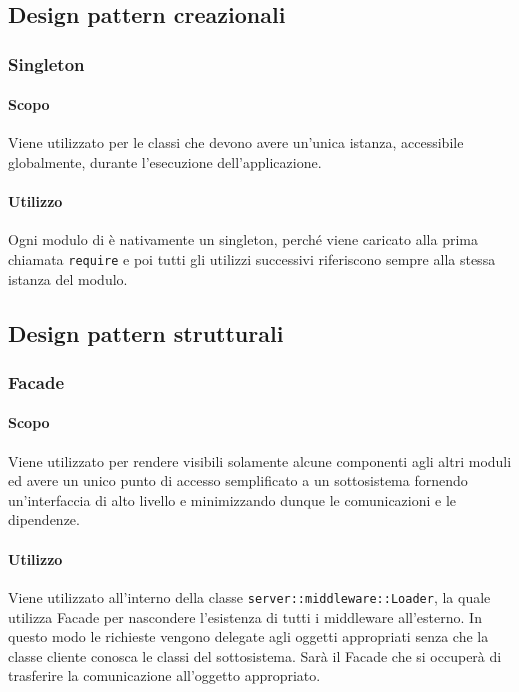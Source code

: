 \documentclass[12pt,a4paper]{article}
\begin{document}
\subsection{Design pattern creazionali}

\subsubsection{Singleton}
\paragraph{Scopo}
Viene utilizzato per le classi che devono avere un’unica istanza, accessibile globalmente, durante l’esecuzione dell’applicazione.
\paragraph{Utilizzo}
Ogni modulo di  è nativamente un singleton, perché viene caricato alla prima chiamata \texttt{require} e poi tutti gli utilizzi successivi riferiscono sempre alla stessa istanza del modulo.

\subsection{Design pattern strutturali}

\subsubsection{Facade}
\paragraph{Scopo}
Viene utilizzato per rendere visibili solamente alcune componenti agli altri moduli ed avere un unico punto di accesso semplificato a un sottosistema fornendo un’interfaccia di alto livello e minimizzando dunque le comunicazioni e le dipendenze.

\paragraph{Utilizzo}
Viene utilizzato all’interno della classe \texttt{server::middleware::Loader}, la quale utilizza Facade per nascondere l’esistenza di tutti i middleware all'esterno. In questo modo le richieste vengono delegate agli oggetti appropriati senza che la classe cliente conosca le classi del sottosistema. Sarà il Facade che si occuperà di trasferire la comunicazione all’oggetto appropriato.
\end{document}
